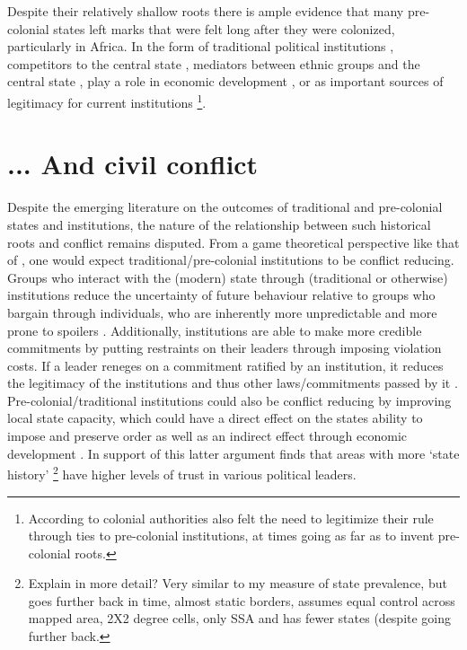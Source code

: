 \documentclass[12pt]{article}
\begin{document}
Despite their relatively shallow roots there is ample evidence that many
pre-colonial states left marks that were felt long after they were colonized,
particularly in Africa. In the form of traditional political institutions
\citep{Beall_2005, Holzinger_2020, Neupert_Wentz_2021, Ubink_2008}, competitors
to the central state \citep{Herbst2014}, mediators between ethnic groups and the
central state \citep{boone2014property, Englebert2002}, play a role in economic
development \citep{Michalopoulos2018, Acemoglu2014, Gennaioli2007,
Bockstette2002}, or as important sources of legitimacy for current
	institutions \citep{Wig2016}\footnote{According to
		\citet{mamdani2018citizen} colonial authorities also felt the
	need to legitimize their rule through ties to pre-colonial institutions,
at times going as far as to invent pre-colonial roots.}.

\section{... And civil conflict}

Despite the emerging literature on the outcomes of traditional and pre-colonial
states and institutions, the nature of the relationship between such historical
roots and conflict remains disputed. From a game theoretical perspective like
that of \citet{Fearon1995}, one would expect traditional/pre-colonial
institutions to be conflict reducing. Groups who interact with the (modern)
state through (traditional or otherwise) institutions reduce the uncertainty of
future behaviour relative to groups who bargain through individuals, who are
inherently more unpredictable and more prone to spoilers \citep{Wig2016}.
Additionally, institutions are able to make more credible commitments by putting
restraints on their leaders through imposing violation costs. If a leader
reneges on a commitment ratified by an institution, it reduces the legitimacy of
the institutions and thus other laws/commitments passed by it \citep{Wig2016}.
Pre-colonial/traditional institutions could also be conflict reducing by
improving local state capacity, which could have a direct effect on the states
ability to impose and preserve order as well as an indirect effect through
economic development \citep{Depetris-Chauvin2016}. In support of this latter
argument \citet{Depetris-Chauvin2016} finds that areas with more `state history'
\footnote{Explain in more detail? Very similar to my measure of state
	prevalence, but goes further back in time, almost static borders,
assumes equal control across mapped area, 2X2 degree cells, only SSA and has
fewer states (despite going further back.} have higher levels of trust in
various political leaders.
\end{document}
